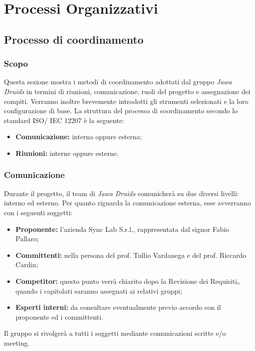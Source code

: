 \chapter{Processi Organizzativi}\label{ProcessiOrganizzativi}

\section{Processo di coordinamento}\label{ProcessiOrganizzativiProcessoDiCoordinamento}

\subsection{Scopo}\label{ProcessiOrganizzativiProcessoDiCoordinamentoScopo}
Questa sezione mostra i metodi di coordinamento adottati dal gruppo \textit{Jawa Druids} in termini di riunioni, comunicazione, ruoli del progetto e assegnazione dei compiti. Verranno inoltre brevemente introdotti gli strumenti selezionati e la loro configurazione di base. La struttura del processo di coordinamento secondo lo standard ISO/ IEC 12207 è la seguente:
\begin{itemize}
	\item \textbf{Comunicazione:} interna oppure esterna;
	\item \textbf{Riunioni:} interne oppure esterne.
\end{itemize}
\subsection{Comunicazione}\label{ProcessiOrganizzativiProcessoDiCoordinamentoComunicazione}
Durante il progetto, il team di \textit{Jawa Druids} comunicherà su due diversi livelli: interno ed esterno.
Per quanto riguarda la comunicazione esterna, esse avverranno con i seguenti soggetti:
\begin{itemize}
\item \textbf{Proponente:} l'azienda Sync Lab S.r.l., rappresentata dal signor Fabio Pallaro;
	\item \textbf{Committenti:} nella persona del prof. Tullio Vardanega e del prof. Riccardo Cardin;
		\item \textbf{Competitor:} questo punto verrà chiarito dopo la Revisione dei Requisiti$_{\scaleto{G}{3pt}}$ quando i capitolati saranno assegnati ai relativi gruppi;
			\item \textbf{Esperti interni:} da consultare eventualmente previo accordo con il proponente ed i committenti.
\end{itemize}
Il gruppo si rivolgerà a tutti i soggetti mediante comunicazioni scritte e/o meeting.
